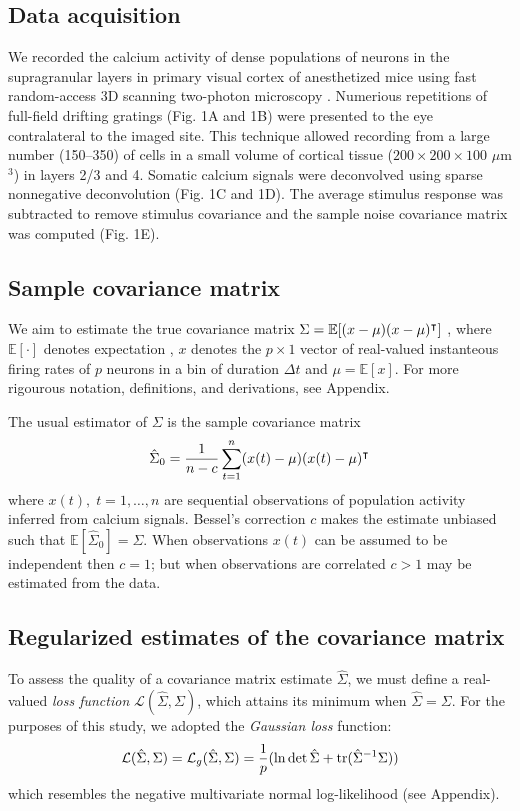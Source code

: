 \subsection*{Data acquisition}
We recorded the calcium activity  of dense populations of neurons in the supragranular layers in primary visual cortex of anesthetized mice using fast random-access 3D scanning two-photon microscopy \cite{Stosiek:2003,Reddy:2005}.  Numerious repetitions of full-field drifting gratings (Fig. 1A and 1B) were presented to the eye contralateral to the imaged site. This technique allowed recording from a large number (150--350) of cells in a small volume of cortical tissue ($200\times200\times100$ $\mu$m$^3$) in layers 2/3 and 4. Somatic calcium signals were deconvolved using  sparse nonnegative deconvolution \cite{Vogelstein:2010} (Fig. 1C and 1D).  The average stimulus response was subtracted to remove stimulus covariance and the sample noise covariance matrix was computed (Fig. 1E).



\subsection*{Sample covariance matrix}
We aim to estimate the true covariance matrix $\Sigma = \mathbb E [(x-\mu)(x-\mu)^\intercal]$ , where $\mathbb E[\cdot]$ denotes expectation , $x$ denotes the $p\times 1$ vector of real-valued instanteous firing rates of $p$ neurons in a bin of duration $\Delta t$ and $\mu = \mathbb E[x]$.  For more rigourous notation, definitions, and derivations, see Appendix. 

The usual estimator of $\Sigma$ is the sample covariance matrix
\begin{equation}
\hat \Sigma_0 = \frac 1 {n-c} \sum\limits_{t=1}^n (x(t)-\mu)(x(t)-\mu)^\intercal 
\end{equation}
where $x(t),\;t=1,\ldots,n$ are sequential observations of population activity inferred from calcium signals. Bessel's correction $c$ makes the estimate unbiased such that $\mathbb E[\hat\Sigma_0] = \Sigma$. When observations $x(t)$ can be assumed to be independent then $c=1$; but when observations are correlated $c>1$ may be estimated from the data. 

\subsection*{Regularized estimates of the covariance matrix}
To assess the quality of a covariance matrix estimate $\hat\Sigma$, we must define a real-valued \emph{loss function} $\mathcal L(\hat\Sigma,\Sigma)$, which attains its minimum when $\hat\Sigma = \Sigma$. For the purposes of this study, we adopted the \emph{Gaussian loss} function:
\begin{equation}
\mathcal L(\hat\Sigma,\Sigma) = \mathcal L_g(\hat\Sigma,\Sigma) = \frac 1 p(\ln \det \hat \Sigma + \operatorname{tr}(\hat \Sigma^{-1}\Sigma))
\end{equation}
which resembles the negative multivariate normal log-likelihood (see Appendix).
 

